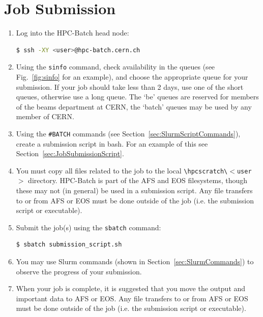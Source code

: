 \documentclass[a4paper]{cernatsnote}
\begin{document}
\section{Job Submission}
\label{sec:jobsubmission}

\begin{enumerate}
\item Log into the HPC-Batch head node:
\begin{lstlisting}[language=bash, belowskip=-3\medskipamount]
$ ssh -XY <user>@hpc-batch.cern.ch
\end{lstlisting}

\item Using the \texttt{sinfo} command, check availability in the queues (see Fig.~\ref{fig:sinfo} for an example), and choose the appropriate queue for your submission. If your job should take less than 2 days, use one of the short queues, otherwise use a long queue. The `be' queues are reserved for members of the beams department at CERN, the `batch' queues may be used by any member of CERN.

\item Using the \texttt{\#BATCH} commands (see Section~\ref{sec:SlurmScriptCommands}), create a submission script in bash. For an example of this see Section~\ref{sec:JobSubmissionScript}.

\item You must copy all files related to the job to the local \texttt{\textbackslash hpcscratch\textbackslash $<$user$>$} directory. HPC-Batch is part of the AFS and EOS filesystems, though these may not (in general) be used in a submission script. Any file transfers to or from AFS or EOS must be done outside of the job (i.e. the submission script or executable).

\item Submit the job(s) using the \texttt{sbatch} command:
\begin{lstlisting}[language=bash, belowskip=-3\medskipamount]
$ sbatch submission_script.sh
\end{lstlisting}

\item You may use Slurm commands (shown in Section~\ref{sec:SlurmCommands}) to observe the progress of your submission.

\item When your job is complete, it is suggested that you move the output and important data to AFS or EOS. Any file transfers to or from AFS or EOS must be done outside of the job (i.e. the submission script or executable).
\end{enumerate}
\end{document}
